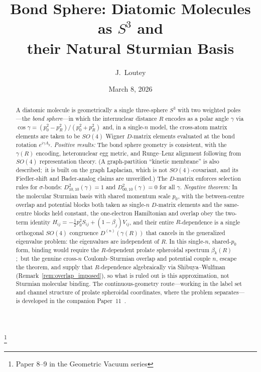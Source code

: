 \documentclass[aps,pra,twocolumn,superscriptaddress,longbibliography]{revtex4-2}
\theoremstyle{remark}
\theoremstyle{plain}
\begin{document}
\title{Bond Sphere: Diatomic Molecules as $S^3$ and\\
their Natural Sturmian Basis}
\thanks{Paper 8--9 in the Geometric Vacuum series}

\author{J.~Loutey}

\date{March 8, 2026}

\begin{abstract}
A diatomic molecule is geometrically a single three-sphere $S^3$ with two
weighted poles---the \emph{bond sphere}---in which the internuclear distance
$R$ encodes as a polar angle $\gamma$ via
$\cos\gamma = (p_0^2 - p_R^2)/(p_0^2 + p_R^2)$ and, in a single-$n$ model,
the cross-atom matrix elements are taken to be $SO(4)$ Wigner $D$-matrix
elements evaluated at the bond rotation $e^{i\gamma A_y}$.
\emph{Positive results:}
The bond sphere geometry is consistent, with the $\gamma(R)$ encoding,
heteronuclear egg metric, and Runge--Lenz alignment following from $SO(4)$
representation theory.  (A graph-partition ``kinetic membrane'' is also
described;\ it is built on the graph Laplacian, which is not
$SO(4)$-covariant, and its Fiedler-shift and Bader-analog claims are
unverified.)
The $D$-matrix enforces selection rules for $\sigma$-bonds:
$D^2_{10,10}(\gamma) = 1$ and $D^2_{00,10}(\gamma) = 0$ for all $\gamma$.
\emph{Negative theorem:}
In the molecular Sturmian basis with shared momentum scale $p_0$, with the
between-centre overlap and potential blocks both taken as single-$n$
$D$-matrix elements and the same-centre blocks held constant, the
one-electron Hamiltonian and overlap obey the two-term identity
$H_{ij} = -\tfrac{1}{2}p_0^2 S_{ij} + (1-\beta_j)V_{ij}$, and their entire
$R$-dependence is a single orthogonal $SO(4)$ congruence $D^{(n)}(\gamma(R))$
that cancels in the generalized eigenvalue problem: the eigenvalues are
independent of $R$.  In this single-$n$, shared-$p_0$ form, binding would require the
$R$-dependent prolate spheroidal spectrum $\beta_k(R)$;\ but the genuine
cross-$n$ Coulomb--Sturmian overlap and potential couple $n$, escape the
theorem, and supply that $R$-dependence algebraically via Shibuya--Wulfman
(Remark~\ref{rem:overlap_imposed}), so what is ruled out is this approximation,
not Sturmian molecular binding.  The continuous-geometry route---working in the
label set and channel structure of prolate spheroidal coordinates, where the
problem separates---is developed
in the companion Paper~11~\cite{loutey_paper11}.
\end{abstract}
\end{document}

